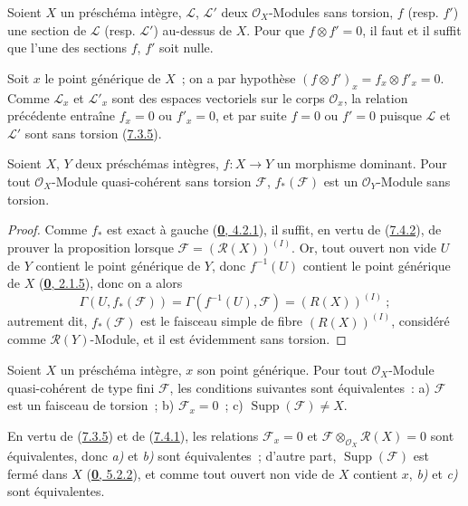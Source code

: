 \begin{corollary}[7.4.4]
\label{I.7.4.4-fr}
Soient $X$ un préschéma intègre, $\mathscr{L}$, $\mathscr{L}'$ deux
$\mathscr{O}_X$-Modules sans torsion, $f$ \textup{(resp. $f'$)} une section de
$\mathscr{L}$ \textup{(resp. $\mathscr{L}'$)} au-dessus de $X$. Pour que
$f\otimes f'=0$, il faut et il suffit que l'une des sections $f$, $f'$ soit
nulle.
\end{corollary}

Soit $x$ le point générique de $X$~; on a par hypothèse
$(f\otimes f')_x=f_x\otimes f'_x=0$. Comme $\mathscr{L}_x$ et
$\mathscr{L}'_x$ sont des espaces vectoriels sur le corps
$\mathscr{O}_x$, la relation précédente entraîne $f_x=0$ ou $f'_x=0$, et par
suite $f=0$ ou $f'=0$ puisque $\mathscr{L}$ et $\mathscr{L}'$ sont sans
torsion (\hyperref[I.7.3.5-fr]{7.3.5}).

\begin{proposition}[7.4.5]
\label{I.7.4.5-fr}
Soient $X$, $Y$ deux préschémas intègres, $f:X\to Y$ un morphisme dominant.
Pour tout $\mathscr{O}_X$-Module quasi-cohérent sans torsion $\mathscr{F}$,
$f_*(\mathscr{F})$ est un $\mathscr{O}_Y$-Module sans torsion.
\end{proposition}

\begin{proof}
Comme $f_*$ est exact à gauche
(\hyperref[0.4.2.1-fr]{\textbf{0}, 4.2.1}), il suffit, en vertu de
(\hyperref[I.7.4.2-fr]{7.4.2}), de prouver la proposition lorsque
$\mathscr{F}=(\mathscr{R}(X))^{(I)}$. Or, tout ouvert non vide $U$ de $Y$
contient le point générique de $Y$, donc $f^{-1}(U)$ contient le point
générique de $X$ (\hyperref[0.2.1.5-fr]{\textbf{0}, 2.1.5}), donc on a alors
\[
  \Gamma(U,f_*(\mathscr{F}))
  =\Gamma(f^{-1}(U),\mathscr{F})=(R(X))^{(I)}~;
\]
autrement dit, $f_*(\mathscr{F})$ est le faisceau simple de fibre
$(R(X))^{(I)}$, considéré comme $\mathscr{R}(Y)$-Module, et il est évidemment
sans torsion.
\end{proof}

\begin{proposition}[7.4.6]
\label{I.7.4.6-fr}
Soient $X$ un préschéma intègre, $x$ son point générique. Pour tout
$\mathscr{O}_X$-Module quasi-cohérent de type fini $\mathscr{F}$, les
conditions suivantes sont équivalentes~: \textup{a)} $\mathscr{F}$ est un faisceau de
torsion~; \textup{b)} $\mathscr{F}_x=0$~; \textup{c)}
$\operatorname{Supp}(\mathscr{F})\neq X$.
\end{proposition}

En vertu de (\hyperref[I.7.3.5-fr]{7.3.5}) et de
(\hyperref[I.7.4.1-fr]{7.4.1}), les relations $\mathscr{F}_x=0$ et
$\mathscr{F}\otimes_{\mathscr{O}_X}\mathscr{R}(X)=0$ sont équivalentes, donc
\emph{a)} et \emph{b)} sont équivalentes~; d'autre part,
$\operatorname{Supp}(\mathscr{F})$ est fermé dans $X$
(\hyperref[0.5.2.2-fr]{\textbf{0}, 5.2.2}), et comme tout ouvert non vide de $X$
contient $x$, \emph{b)} et \emph{c)} sont équivalentes.

